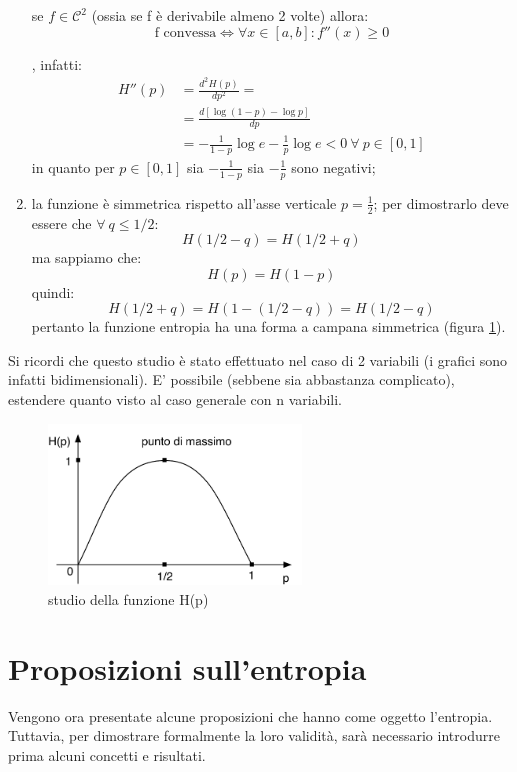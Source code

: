 \begin{enumerate}
{\begin{teorema}
se \(f \in \mathcal{C}^2\) (ossia se f è derivabile almeno 2 volte) allora:
\[\mbox{f convessa} \iff \forall x \in [a,b]: f''(x) \geq 0\]
\label{concava}
\end{teorema}
}, infatti:
\[
\begin{split} 
H''(p) &= \frac{d^2 H(p)}{dp^2} = \\ 
&= \frac{d [\log(1-p) - \log p]}{dp} \\ 
&= - \frac{1}{1-p}\log e - \frac{1}{p} \log e < 0 \ \forall \ p \in [0,1]
\end{split} 
\]
in quanto per \(p \in [0,1]\) sia \(- \frac{1}{1-p}\) sia \(- \frac{1}{p}\) sono negativi;
\item la funzione è simmetrica rispetto all'asse verticale \(p = \frac{1}{2}\); per dimostrarlo deve essere che \(\forall \ q \leq 1/2\):
\[H(1/2 - q) = H(1/2 + q)\]
ma sappiamo che:
\[H(p) = H(1-p)\]
quindi:
\[H(1/2 + q) = H(1-(1/2 - q)) = H(1/2 - q)\]
pertanto la funzione entropia ha una forma a campana simmetrica (figura \ref{fig:entropia}).
\end{enumerate}
Si ricordi che questo studio è stato effettuato nel caso di 2 variabili (i grafici sono infatti bidimensionali). E' possibile (sebbene 
sia abbastanza complicato), estendere quanto visto al caso generale con n variabili.

\begin{figure}[htbp]
\begin{center}
	\includegraphics[width=0.6\textwidth]{img/entropia.pdf}
\caption{studio della funzione H(p)}
\label{fig:entropia}
\end{center}
\end{figure}










\section{Proposizioni sull'entropia}
Vengono ora presentate alcune proposizioni che hanno come oggetto l'entropia.
Tuttavia, per dimostrare formalmente la loro validità, sarà necessario introdurre prima 
alcuni concetti e risultati.
